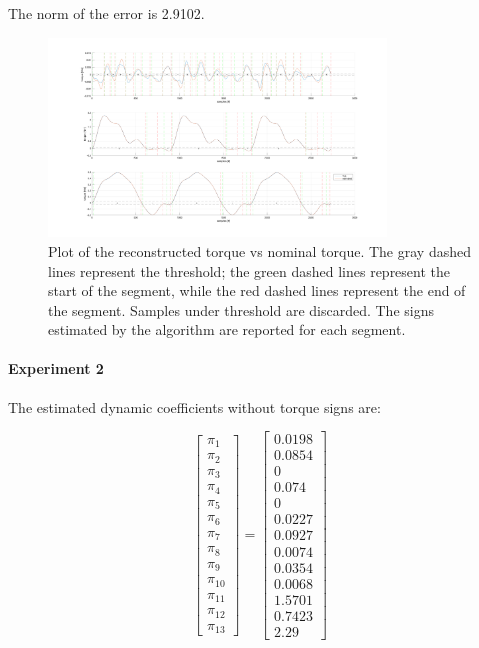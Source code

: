 \documentclass{article}
\begin{document}
The norm of the error is 2.9102.

\begin{figure}[!htbp]
\centering
\includegraphics[width=0.8\textwidth]{images/3-dof/results_experiment1.png}
\caption{Plot of the reconstructed torque vs nominal torque. The gray dashed lines represent the threshold; the green dashed lines represent the start of the segment, while the red dashed lines represent the end of the segment. Samples under threshold are discarded. The signs estimated by the algorithm are reported for each segment.}
\end{figure}
\FloatBarrier

\pagebreak

\paragraph{Experiment 2} The estimated dynamic coefficients without torque signs are:

\[\begin{bmatrix}
\pi_1 \\ \pi_2 \\ \pi_3 \\ \pi_4 \\ \pi_5 \\ \pi_6 \\ \pi_7 \\ \pi_8 \\  \pi_9 \\ \pi_{10} \\ \pi_{11} \\ \pi_{12} \\ \pi_{13}
\end{bmatrix}=\begin{bmatrix}
0.0198 \\ 0.0854 \\ 0 \\ 0.074 \\ 0 \\ 0.0227 \\ 0.0927 \\ 0.0074 \\ 0.0354 \\ 0.0068 \\ 1.5701 \\ 0.7423 \\ 2.29
\end{bmatrix}\]
\end{document}

